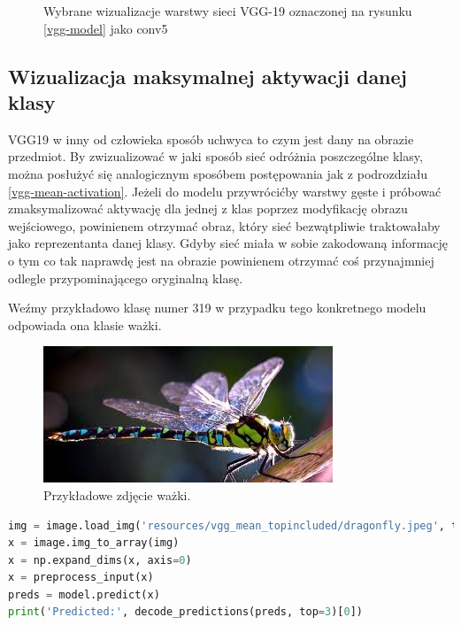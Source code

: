 \begin{figure}
\caption{Wybrane wizualizacje warstwy sieci VGG-19 oznaczonej na rysunku \ref{vgg-model} jako conv5}
\label{mean-vgg-vis-c5bx}
\end{figure}

\subsection{Wizualizacja maksymalnej aktywacji danej klasy}
\label{vgg-class-visualisation}

VGG19 w inny od człowieka sposób uchwyca to czym jest dany na obrazie przedmiot. By zwizualizować w jaki sposób sieć odróżnia poszczególne klasy, można posłużyć się analogicznym sposóbem postępowania jak z podrozdziału \ref{vgg-mean-activation}.
Jeżeli do modelu przywrócićby warstwy gęste i próbować zmaksymalizować aktywację dla jednej z klas poprzez modyfikację obrazu wejściowego, powinienem otrzymać obraz, który sieć bezwątpliwie traktowałaby jako reprezentanta danej klasy.
Gdyby sieć miała w sobie zakodowaną informację o tym co tak naprawdę jest na obrazie powinienem otrzymać coś przynajmniej odlegle przypominającego oryginalną klasę.

Weźmy przykładowo klasę numer 319 w przypadku tego konkretnego modelu odpowiada ona klasie ważki. 

\begin{figure}[ht]
\centerline{\includegraphics[scale=0.8]{resources/vgg_mean_topincluded/dragonfly.jpeg}}
\caption{Przykładowe zdjęcie ważki.}
\label{fig:wazka-real}
\end{figure}

\label{lst:wazka-prediction}
\begin{lstlisting}[language=Python, caption={Predykcja klasy zdjęcia ważki\ref{fig:wazka-real}.}, captionpos=b]
img = image.load_img('resources/vgg_mean_topincluded/dragonfly.jpeg', target_size=(224, 224))
x = image.img_to_array(img)
x = np.expand_dims(x, axis=0)
x = preprocess_input(x)
preds = model.predict(x)
print('Predicted:', decode_predictions(preds, top=3)[0])
\end{lstlisting}

